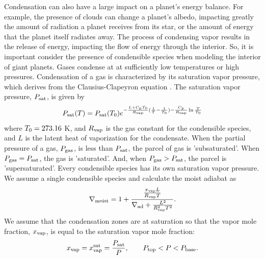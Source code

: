 \documentclass[11pt]{ucscthesisbs}
\begin{document}
Condensation can also have a large impact on a planet's energy balance. For example, the presence of clouds can change a planet's albedo, impacting greatly the amount of radiation a planet receives from its star, or the amount of energy that the planet itself radiates away. The process of condensing vapor results in the release of energy, impacting the flow of energy through the interior. So, it is important consider the presence of condensible species when modeling the interior of giant planets. Gases condense at at sufficiently low temperatures or high pressures. Condensation of a gas is characterized by its saturation vapor pressure, which derives from the Clausius-Clapeyron equation \citep{sanchez_2011}. The saturation vapor pressure, $P_{\rm sat}$, is given by 
\begin{equation}
  P_{\rm sat}(T) = P_{\rm sat}(T_{\rm 0})e^{-\frac{L + C_{\rm p}T_{\rm 0}}{R_{\rm vap}}(\frac{1}{T} - \frac{1}{T_{\rm 0}}) -\frac{C_{\rm p}}{R_{\rm vap}}\ln{\frac{T}{T_{\rm 0}}}}
  \label{eq:saturation_vapor_pressure}
\end{equation}
where $T_{\rm 0} = 273.16$ K, and $R_{\rm vap}$ is the gas constant for the condensible species, and $L$ is the latent heat of vaporization for the condensate. When the partial pressure of a gas, $P_{\rm gas}$, is less than $P_{\rm sat}$, the parcel of gas is 'subsaturated'. When $P_{\rm gas} = P_{\rm sat}$, the gas is 'saturated'. And, when $P_{\rm gas} > P_{\rm sat}$, the parcel is 'supersaturated'. Every condensible species has its own saturation vapor pressure. We assume a single condensible species and calculate the moist adiabat as \citep{sanchez_2011} 
\begin{equation}
  \nabla_{\rm moist} = 1 + \frac{\frac{x_{\rm vap} L}{R_{\rm vap}T}}{\nabla_{\rm ad} + \frac{L^2}{R_{\rm vap}^2 T^2}}.
\end{equation}
We assume that the condensation zones are at saturation so that the vapor mole fraction, $x_{\rm vap}$, is equal to the saturation vapor mole fraction:
\begin{equation}
x_{\rm vap} = x_{\rm vap}^{\rm sat} = \frac{P_{\rm sat}}{P}, \qquad P_{\rm top} < P < P_{\rm base}.
\end{equation}
\end{document}
